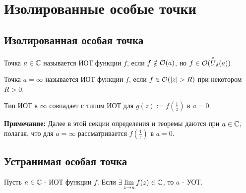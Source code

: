 \section{Изолированные особые точки}
\subsection{Изолированная особая точка}
\begin{definition}
  Точка $a\in\mathbb{C}$ называется ИОТ функции $f$, если $f\notin\mathcal{O}(a)$, но $f\in\mathcal{O}(\overset{\circ}{U}_\delta(a))$ 
\end{definition}
\begin{definition}
  Точка $a=\infty$ называется ИОТ функции $f$, если $f\in\O(|z|>R)$ при некотором $R>0$.

  Тип ИОТ в $\infty$ совпадает с типом ИОТ для $g(z):=f(\frac{1}{z})$ в $a=0$.
\end{definition}
\textbf{Примечание:} Далее в этой секции определения и теоремы даются при $a\in\mathbb{C}$, полагая, что для $a=\infty$ рассматривается $f(\frac{1}{z})$ в $a=0$. 
\subsection{Устранимая особая точка}
\begin{definition}
  Пусть $a\in\mathbb{C}$ - ИОТ функции $f$. Если $\exists \lim\limits_{z \rightarrow a}f(z)\in\mathbb{C}$, то $a$ - УОТ.
\end{definition}
